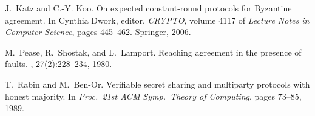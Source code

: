 \documentclass{sig-alternate}
\begin{document}
\begin{thebibliography}{10}
J.~Katz and C.-Y. Koo.
\newblock On expected constant-round protocols for Byzantine agreement.
\newblock In Cynthia Dwork, editor, {\em CRYPTO}, volume 4117 of {\em Lecture
  Notes in Computer Science}, pages 445--462. Springer, 2006.

M.~Pease, R.~Shostak, and L.~Lamport.
\newblock Reaching agreement in the presence of faults.
, 27(2):228--234, 1980.

T.~Rabin and M.~Ben{-}Or.
\newblock Verifiable secret sharing and multiparty protocols with honest
  majority.
\newblock In {\em Proc.~21st ACM Symp.~Theory of Computing}, pages 73--85,
  1989.

\end{thebibliography}
\end{document}
